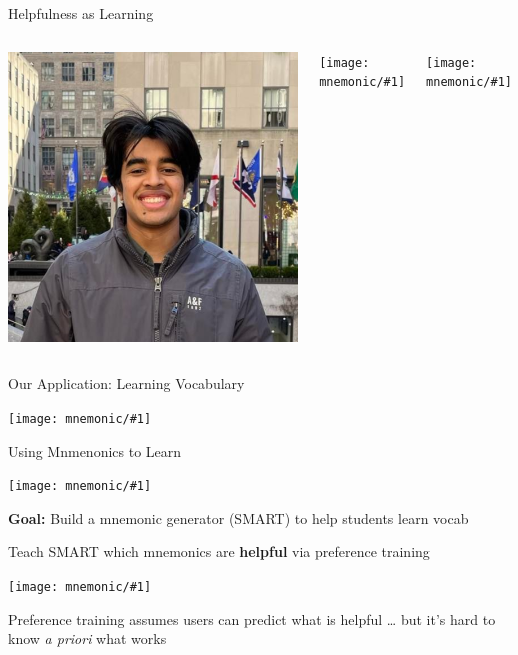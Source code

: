 \documentclass[compress]{beamer}
\newcommand{\gfxm}[2]{
\begin{center}
	\texttt{[image: mnemonic/\#1]}
\end{center}
}
\begin{document}
\begin{frame}{Helpfulness as Learning}
	\begin{columns}
			\includegraphics[width=.9\linewidth]{general_figures/nishant}
			\gfxm{karl_paper}{.9}
			\gfxm{mnemonic_paper}{.9}
	\end{columns}
\end{frame}

\begin{frame}{Our Application: Learning Vocabulary}
	
	\gfxm{vocab}{.9}
\end{frame}

\begin{frame}{Using Mnmenonics to Learn}
	
	\gfxm{mnemonic}{.9}
	
	\textbf{Goal:} Build a mnemonic generator (SMART) to help students learn vocab
	
\end{frame}

\begin{frame}{Teach SMART which mnemonics are \textbf{helpful} via preference training}
	
	\gfxm{preference}{.9}
	
	Preference training assumes users can predict what is helpful \dots
	\pause
	but it's hard to know \textit{a priori} what works
	
\end{frame}
\end{document}
